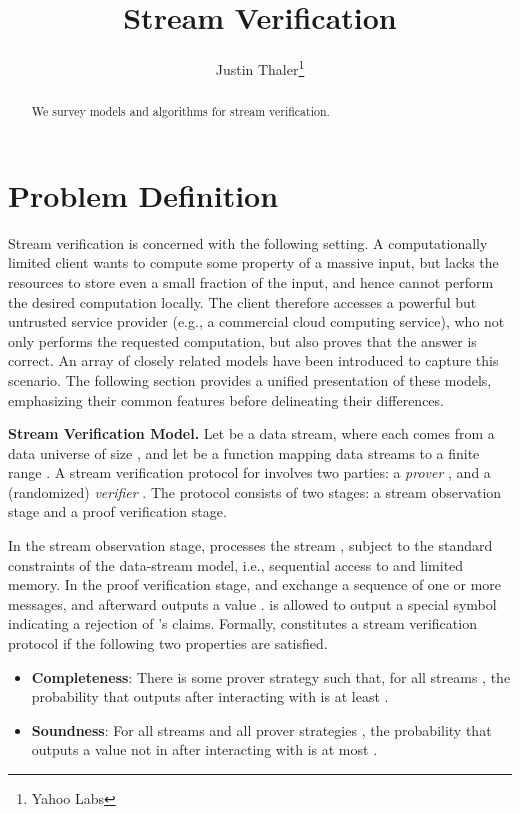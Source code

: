 \documentclass[11pt, letterpaper]{article}
\begin{document}
\title{Stream Verification}

\author{Justin Thaler\thanks{Yahoo Labs}}

\maketitle 

\begin{abstract}
We survey models and algorithms for stream verification. 
\end{abstract}

\section{Problem Definition}

Stream verification is concerned with the following setting. 
A computationally limited client wants to compute some property of a massive input, but lacks the resources to store even a small fraction of the input, and hence cannot perform the desired computation locally. The client therefore accesses a powerful but untrusted service provider (e.g., a commercial cloud computing service), who not only performs the requested computation, but also proves that the answer is correct.
An array of closely related models have been introduced to capture this scenario. The following section provides a unified presentation of these models, emphasizing their common features before delineating their differences. 

\medskip
\noindent \textbf{Stream Verification Model.}
Let  be a data stream, where each  comes from a data universe  of size , and let  be a function mapping data streams to a finite range . 
A stream verification protocol for  involves two parties: a \emph{prover} , and a (randomized) \emph{verifier} . The protocol consists of two stages:  a stream observation stage and a proof verification stage. 
 
In the stream observation stage,  processes the stream , subject to the 
standard constraints of the data-stream model, i.e., sequential access to  and limited memory. 
In the proof verification stage,  and  exchange a sequence of one or more messages, and afterward  outputs a value .  is allowed to output a special symbol  indicating a rejection of 's claims.  Formally,  constitutes a stream verification protocol if the following two properties are satisfied.

\begin{itemize}
\item \textbf{Completeness}: There is some prover strategy  such that, for all streams , the probability that  outputs  after interacting with  is at least . 
\item \textbf{Soundness}: For all streams  and all prover strategies , the probability that  outputs a value not in  after interacting with  is at most .
\end{itemize}
\end{document}
